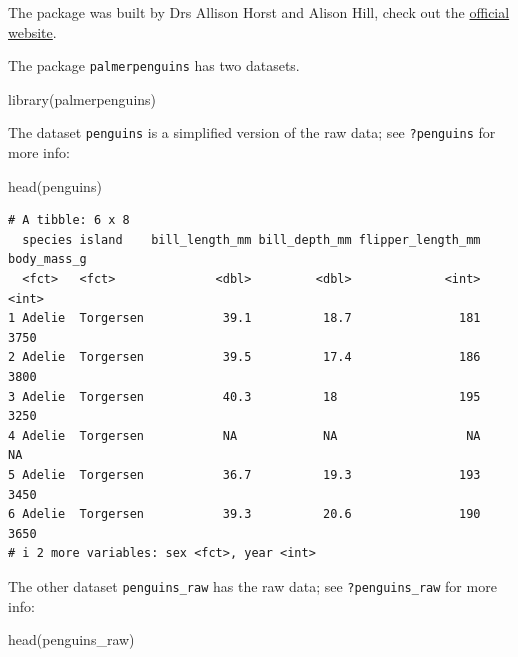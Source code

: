 \documentclass[
  letterpaper,
  DIV=11,
  numbers=noendperiod]{scrreprt}
\newenvironment{Shaded}{\begin{snugshade}}{\end{snugshade}}
\newcommand{\FunctionTok}[1]{\textcolor[rgb]{0.28,0.35,0.67}{#1}}
\newcommand{\NormalTok}[1]{\textcolor[rgb]{0.00,0.23,0.31}{#1}}
\begin{document}
The package was built by Drs Allison Horst and Alison Hill, check out
the \href{https://allisonhorst.github.io/palmerpenguins/}{official
website}.

The package \texttt{palmerpenguins} has two datasets.

\begin{Shaded}
\begin{Highlighting}[]
\FunctionTok{library}\NormalTok{(palmerpenguins)}
\end{Highlighting}
\end{Shaded}

The dataset \texttt{penguins} is a simplified version of the raw data;
see \texttt{?penguins} for more info:

\begin{Shaded}
\begin{Highlighting}[]
\FunctionTok{head}\NormalTok{(penguins)}
\end{Highlighting}
\end{Shaded}

\begin{verbatim}
# A tibble: 6 x 8
  species island    bill_length_mm bill_depth_mm flipper_length_mm body_mass_g
  <fct>   <fct>              <dbl>         <dbl>             <int>       <int>
1 Adelie  Torgersen           39.1          18.7               181        3750
2 Adelie  Torgersen           39.5          17.4               186        3800
3 Adelie  Torgersen           40.3          18                 195        3250
4 Adelie  Torgersen           NA            NA                  NA          NA
5 Adelie  Torgersen           36.7          19.3               193        3450
6 Adelie  Torgersen           39.3          20.6               190        3650
# i 2 more variables: sex <fct>, year <int>
\end{verbatim}

The other dataset \texttt{penguins\_raw} has the raw data; see
\texttt{?penguins\_raw} for more info:

\begin{Shaded}
\begin{Highlighting}[]
\FunctionTok{head}\NormalTok{(penguins\_raw)}
\end{Highlighting}
\end{Shaded}
\end{document}
